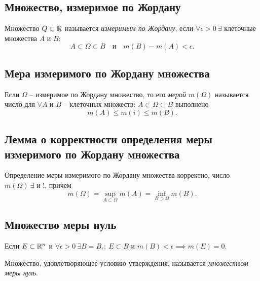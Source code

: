 \subsection{Множество, измеримое по Жордану}

\begin{definition}
    Множество $ Q \subset \mathbb{R} $ называется \emph{измеримым по Жордану}, если $ \forall \epsilon > 0 \ \exists $ клеточные множества $ A $ и $ B $:
    \[
        A \subset \Omega \subset B \quad \text{и} \quad m(B) - m(A) < \epsilon.
    \]
\end{definition}

\subsection{Мера измеримого по Жордану множества}

\begin{definition}
    Если $ \Omega $ -- измеримое по Жордану множество, то его \emph{мерой} $ m(\Omega) $ называется число для $ \forall A $ и $ B $ -- клеточных множеств: $ A \subset \Omega \subset B $ выполнено
    \[
        m(A) \leqslant m(i) \leqslant m(B).
    \]
\end{definition}

\subsection{Лемма о корректности определения меры измеримого по Жордану множества}

\begin{lemma}
    Определение меры измеримого по Жордану множества корректно, число $ m(\Omega) \ \exists $ и $ ! $, причем
    \[
        m(\Omega) = \underset{A\subset\Omega}{\sup}m(A) = \underset{B\supset\Omega}{\inf}m(B).
    \]
\end{lemma}

\subsection{Множество меры нуль}

\begin{statement}
    Если $ E \subset \mathbb{R}^n $ и $ \forall \epsilon > 0 \ \exists B = B_\epsilon: \ E \subset B $ и $ m(B) < \epsilon \implies m(E) = 0 $.
\end{statement}

\begin{definition}
    Множество, удовлетворяющее условию утверждения, называется \emph{множеством меры нуль}.
\end{definition}

